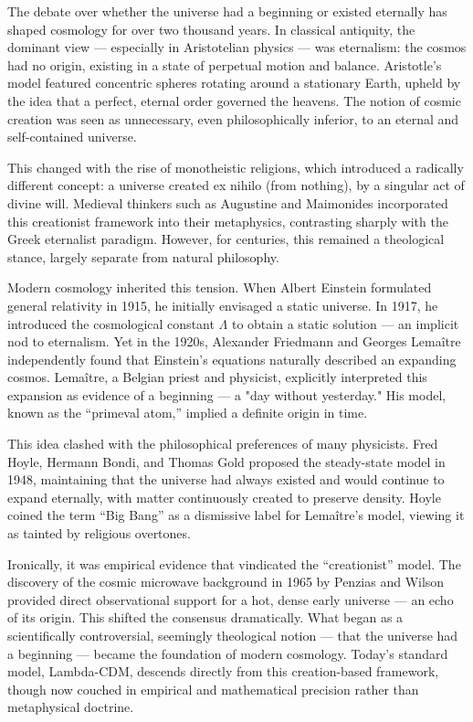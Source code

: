 \begin{historical}
The debate over whether the universe had a beginning or existed eternally has shaped cosmology for over two thousand years. In classical antiquity, the dominant view — especially in Aristotelian physics — was eternalism: the cosmos had no origin, existing in a state of perpetual motion and balance. Aristotle’s model featured concentric spheres rotating around a stationary Earth, upheld by the idea that a perfect, eternal order governed the heavens. The notion of cosmic creation was seen as unnecessary, even philosophically inferior, to an eternal and self-contained universe.

This changed with the rise of monotheistic religions, which introduced a radically different concept: a universe created ex nihilo (from nothing), by a singular act of divine will. Medieval thinkers such as Augustine and Maimonides incorporated this creationist framework into their metaphysics, contrasting sharply with the Greek eternalist paradigm. However, for centuries, this remained a theological stance, largely separate from natural philosophy.

Modern cosmology inherited this tension. When Albert Einstein formulated general relativity in 1915, he initially envisaged a static universe. In 1917, he introduced the cosmological constant \(\Lambda\) to obtain a static solution — an implicit nod to eternalism. Yet in the 1920s, Alexander Friedmann and Georges Lemaître independently found that Einstein’s equations naturally described an expanding cosmos. Lemaître, a Belgian priest and physicist, explicitly interpreted this expansion as evidence of a beginning — a "day without yesterday." His model, known as the “primeval atom,” implied a definite origin in time.

This idea clashed with the philosophical preferences of many physicists. Fred Hoyle, Hermann Bondi, and Thomas Gold proposed the steady-state model in 1948, maintaining that the universe had always existed and would continue to expand eternally, with matter continuously created to preserve density. Hoyle coined the term “Big Bang” as a dismissive label for Lemaître’s model, viewing it as tainted by religious overtones.

Ironically, it was empirical evidence that vindicated the “creationist” model. The discovery of the cosmic microwave background in 1965 by Penzias and Wilson provided direct observational support for a hot, dense early universe — an echo of its origin. This shifted the consensus dramatically. What began as a scientifically controversial, seemingly theological notion — that the universe had a beginning — became the foundation of modern cosmology. Today’s standard model, Lambda-CDM, descends directly from this creation-based framework, though now couched in empirical and mathematical precision rather than metaphysical doctrine.
\end{historical}

